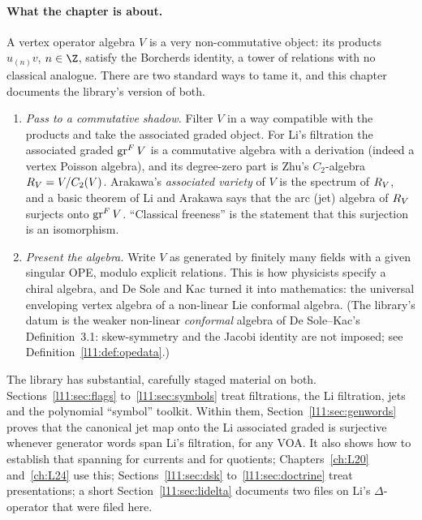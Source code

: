 \paragraph{What the chapter is about.} A vertex operator algebra $V$ is a very non-commutative
object: its products $u_{(n)}v$, $n\in\Z$, satisfy the Borcherds identity, a tower of
relations with no classical analogue. There are two standard ways to tame it, and this chapter
documents the library's version of both.
\begin{enumerate}
\item \emph{Pass to a commutative shadow.} Filter $V$ in a way compatible with the products and
  take the associated graded object. For Li's filtration the associated graded
  $\operatorname{gr}^F V$ is a commutative algebra with a derivation (indeed a vertex Poisson
  algebra), and its degree-zero part is Zhu's $C_2$-algebra $R_V = V/C_2(V)$. Arakawa's
  \emph{associated variety} of $V$ is the spectrum of $R_V$, and a basic theorem of Li and
  Arakawa says that the arc (jet) algebra of $R_V$ surjects onto $\operatorname{gr}^F V$.
  ``Classical freeness'' is the statement that this surjection is an isomorphism.
\item \emph{Present the algebra.} Write $V$ as generated by finitely many fields with a given
  singular OPE, modulo explicit relations. This is how physicists specify a chiral algebra, and De
  Sole and Kac turned it into mathematics: the universal enveloping vertex algebra of a
  non-linear Lie conformal algebra. (The library's datum  is the weaker non-linear \emph{conformal} algebra of
  De Sole--Kac's Definition~3.1: skew-symmetry and the Jacobi identity are not imposed; see Definition~\ref{l11:def:opedata}.)
\end{enumerate}
The library has substantial, carefully staged material on both. Sections~\ref{l11:sec:flags}
to~\ref{l11:sec:symbols} treat filtrations, the Li filtration, jets and the polynomial ``symbol''
toolkit. Within them, Section~\ref{l11:sec:genwords} proves that the canonical jet map onto the Li associated graded is
surjective whenever generator words span Li's filtration, for any VOA. It also shows how to establish that spanning for
currents and for quotients; Chapters~\ref{ch:L20} and~\ref{ch:L24} use this; Sections~\ref{l11:sec:dsk} to~\ref{l11:sec:doctrine} treat presentations; a short
Section~\ref{l11:sec:lidelta} documents two files on Li's $\Delta$-operator that were filed here.

